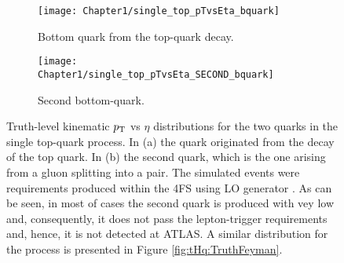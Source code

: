 \begin{figure}
\centering
\begin{subfigure}{.5\textwidth}
  \centering
  \texttt{[image: Chapter1/single\_top\_pTvsEta\_bquark]}
  \caption{Bottom quark from the top-quark decay.}
  \label{fig:Chap1:top:singletop:tchannel:ptVSeta:b}
\end{subfigure}%
\begin{subfigure}{.5\textwidth}
  \centering
  \texttt{[image: Chapter1/single\_top\_pTvsEta\_SECOND\_bquark]}
  \caption{Second bottom-quark.}
  \label{fig:Chap1:top:singletop:tchannel:ptVSeta:second_B}
\end{subfigure}
\caption{Truth-level kinematic $p_{\text{T}}$ vs $\eta$ distributions for the two \Pbottom quarks 
in the single top-quark \tchannel process.
In (a) the \Pbottom quark originated from the decay of the top quark. In (b) the second \Pbottom quark, 
which is the one arising from a gluon splitting into a \bbar pair. The simulated events were requirements 
produced within the 4FS using \PROTOS LO generator \cite{ATLAS:2017rcx}.  As can be seen, 
in most of cases the second \Pbottom quark is produced with vey low \pT and, consequently, it does not pass the 
lepton-trigger requirements and, hence, it is not detected at ATLAS. A similar distribution for the \tHq process is presented
in Figure \ref{fig:tHq:TruthFeyman}.}
\label{fig:Chap1:top:singletop:tchannel:ptVSeta}
\end{figure}

 







